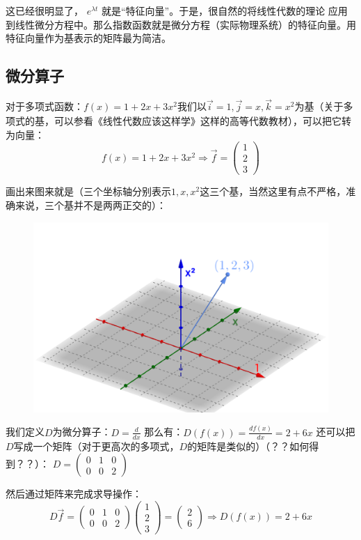 \documentclass[12pt]{article}
\begin{document}
这已经很明显了， $e^{\lambda t}$ 就是“特征向量”。于是，很自然的将线性代数的理论 应用到线性微分方程中。那么指数函数就是微分方程（实际物理系统）的特征向量。用特征向量作为基表示的矩阵最为简洁。

\subsection{微分算子}
对于多项式函数：$f(x)=1+2x+3x^2$我们以$\vec{i_{}}=1,\vec{j_{}}=x,\vec{k_{}}=x^2$为基（关于多项式的基，可以参看《线性代数应该这样学》这样的高等代数教材），可以把它转为向量：
$$
f(x)=1+2x+3x^2 \Rightarrow \vec{f_{}}=\begin{pmatrix}1\\2\\3\end{pmatrix}
$$

画出来图来就是（三个坐标轴分别表示$1,x,x^2$这三个基，当然这里有点不严格，准确来说，三个基并不是两两正交的）：
\begin{figure}[H]
    \centering
    \includegraphics[width=.5\textwidth]{fig/UnderstandLinearDifferentialEquation_1.png}
\end{figure} 
 
我们定义$D$为微分算子：$D=\frac{d}{dx}$
那么有：$D(f(x))=\frac{df(x)}{dx}=2+6x$
还可以把$D$写成一个矩阵（对于更高次的多项式，$D$的矩阵是类似的）（？？如何得到？？）：
$D=\begin{pmatrix}0&1&0\\0&0&2\end{pmatrix}$

然后通过矩阵来完成求导操作：
$$
D\vec{f_{}}=
\begin{pmatrix}0&1&0\\0&0&2\end{pmatrix}\begin{pmatrix}1\\2\\3\end{pmatrix}=\begin{pmatrix}2\\6\end{pmatrix} \Rightarrow D(f(x))=2+6x
$$
\end{document}
